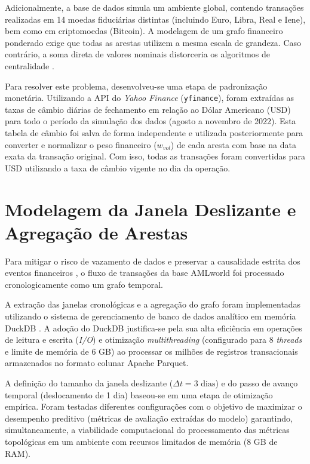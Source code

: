 \documentclass[titlepage,a4paper,oneside,onecolumn,12pt]{report}
\begin{document}
Adicionalmente, a base de dados simula um ambiente global, contendo transações realizadas em 14 moedas fiduciárias distintas (incluindo Euro, Libra, Real e Iene), bem como em criptomoedas (Bitcoin). A modelagem de um grafo financeiro ponderado exige que todas as arestas utilizem a mesma escala de grandeza. Caso contrário, a soma direta de valores nominais distorceria os algoritmos de centralidade \cite{oliveira2025complex}.

Para resolver este problema, desenvolveu-se uma etapa de padronização monetária. Utilizando a API do \textit{Yahoo Finance} (\texttt{yfinance}), foram extraídas as taxas de câmbio diárias de fechamento em relação ao Dólar Americano (USD) para todo o período da simulação dos dados (agosto a novembro de 2022). Esta tabela de câmbio foi salva de forma independente e utilizada posteriormente para converter e normalizar o peso financeiro ($w_{vol}$) de cada aresta com base na data exata da transação original. Com isso, todas as transações foram convertidas para USD utilizando a taxa de câmbio vigente no dia da operação.

\section{Modelagem da Janela Deslizante e Agregação de Arestas}
\label{sec:janela}

Para mitigar o risco de vazamento de dados e preservar a causalidade estrita dos eventos financeiros \cite{sizan2025machine}, o fluxo de transações da base AMLworld foi processado cronologicamente como um grafo temporal.

A extração das janelas cronológicas e a agregação do grafo foram implementadas utilizando o sistema de gerenciamento de banco de dados analítico em memória DuckDB \cite{raasveldt2019duckdb}. A adoção do DuckDB justifica-se pela sua alta eficiência em operações de leitura e escrita (\textit{I/O}) e otimização \textit{multithreading} (configurado para 8 \textit{threads} e limite de memória de 6 GB) ao processar os milhões de registros transacionais armazenados no formato colunar Apache Parquet.

A definição do tamanho da janela deslizante ($\Delta t = 3\text{ dias}$) e do passo de avanço temporal (deslocamento de 1 dia) baseou-se em uma etapa de otimização empírica. Foram testadas diferentes configurações com o objetivo de maximizar o desempenho preditivo (métricas de avaliação extraídas do modelo) garantindo, simultaneamente, a viabilidade computacional do processamento das métricas topológicas em um ambiente com recursos limitados de memória (8 GB de RAM). 
\end{document}
